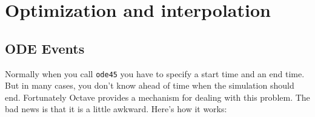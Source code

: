 
\chapter{Optimization and interpolation}

\section{ODE Events}
\label{events}

Normally when you call {\tt ode45} you have to specify
a start time and an end time. But in many cases, you don't know ahead
of time when the simulation should end.
Fortunately Octave provides a mechanism for dealing
with this problem. The bad news is that it is a little awkward.
Here's how it works:

